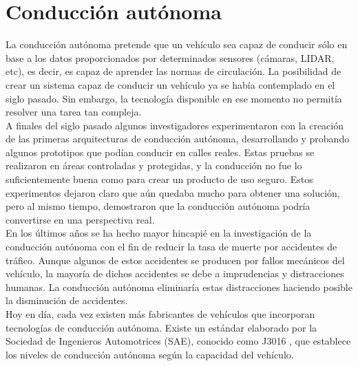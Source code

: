 \section{Conducción autónoma}

La conducción autónoma pretende que un vehículo sea capaz de conducir sólo en base a los datos proporcionados por determinados sensores (cámaras, LIDAR, etc), es decir, es capaz de aprender las normas de circulación. La posibilidad de crear un sistema capaz de conducir un vehículo ya se había contemplado en el siglo pasado. Sin embargo, la tecnología disponible en ese momento no permitía resolver una tarea tan compleja. \\

A finales del siglo pasado algunos investigadores \cite{Dickmanns} \cite{alvinn} experimentaron con la creación de las primeras arquitecturas de conducción autónoma, desarrollando y probando algunos prototipos que podían conducir en calles reales. Estas pruebas se realizaron en áreas controladas y protegidas, y la conducción no fue lo suficientemente buena como para crear un producto de uso seguro. Estos experimentos dejaron claro que aún quedaba mucho para obtener una solución, pero al mismo tiempo, demostraron que la conducción autónoma podría convertirse en una perspectiva real.\\

En los últimos años se ha hecho mayor hincapié en la investigación de la conducción autónoma con el fin de reducir la tasa de muerte por accidentes de tráfico. Aunque algunos de estos accidentes se producen por fallos mecánicos del vehículo, la mayoría de dichos accidentes se debe a imprudencias y distracciones humanas. La conducción autónoma eliminaría estas distracciones haciendo posible la disminución de accidentes.\\

Hoy en día, cada vez existen más fabricantes de vehículos que incorporan tecnologías de conducción autónoma. Existe un estándar elaborado por la Sociedad de Ingenieros Automotrices (SAE), conocido como J3016 \cite{sae}, que establece los niveles de conducción autónoma según la capacidad del vehículo.\\

